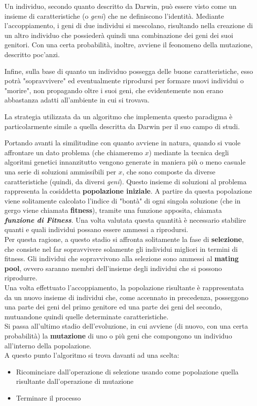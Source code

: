     Un individuo, secondo quanto descritto da Darwin, può essere visto come un insieme di caratteristiche (o \textit{geni}) che ne definiscono l'identità. Mediante l'accoppiamento, i geni di due individui si mescolano, risultando nella creazione di un altro individuo che possiederà quindi una combinazione dei geni dei suoi genitori. Con una certa probabilità, inoltre, avviene il feonomeno della mutazione, descritto poc'anzi.

    Infine, sulla base di quanto un individuo possegga delle buone caratteristiche, esso potrà "sopravvivere" ed eventualmente riprodursi per formare nuovi individui o "morire", non propagando oltre i suoi geni, che evidentemente non erano abbastanza adatti all'ambiente in cui si trovava.

    La strategia utilizzata da un algoritmo che implementa questo paradigma è particolarmente simile a quella descritta da Darwin per il suo campo di studi.

    Portando avanti la similitudine con quanto avviene in natura, quando si vuole affrontare un dato problema (che chiameremo $x$) mediante la tecnica degli algoritmi genetici innanzitutto vengono generate in maniera più o meno casuale una serie di soluzioni ammissibili per $x$, che sono composte da diverse caratteristiche (quindi, da diversi \textit{geni}). Questo insieme di soluzioni al problema rappresenta la cosiddetta \textbf{popolazione iniziale}. A partire da questa popolazione viene solitamente calcolato l'indice di "bontà" di ogni singola soluzione (che in gergo viene chiamata \textbf{fitness}), tramite una funzione apposita, chiamata \textbf{\textit{funzione di Fitness}}. Una volta valutata questa quantità è necessario stabilire quanti e quali individui possano essere ammessi a riprodursi. \\
    Per questa ragione, a questo stadio si affronta solitamente la fase di \textbf{selezione}, che consiste nel far sopravvivere solamente gli individui migliori in termini di fitness. Gli individui che sopravvivono alla selezione sono ammessi al \textbf{mating pool}, ovvero saranno membri dell'insieme degli individui che si possono riprodurre. \\
    Una volta effettuato l'accoppiamento, la popolazione risultante è rappresentata da un nuovo insieme di individui che, come accennato in precedenza, posseggono una parte dei geni del primo genitore ed una parte dei geni del secondo, mutuandone quindi quelle determinate caratteristiche. \\
    Si passa all'ultimo stadio dell'evoluzione, in cui avviene (di nuovo, con una certa probabilità) la \textbf{mutazione} di uno o più geni che compongono un individuo all'interno della popolazione. \\
    A questo punto l'algoritmo si trova davanti ad una scelta: 
    \begin{itemize}
        \item Ricominciare dall'operazione di selezione usando come popolazione quella risultante dall'operazione di mutazione
        \item Terminare il processo
    \end{itemize}

